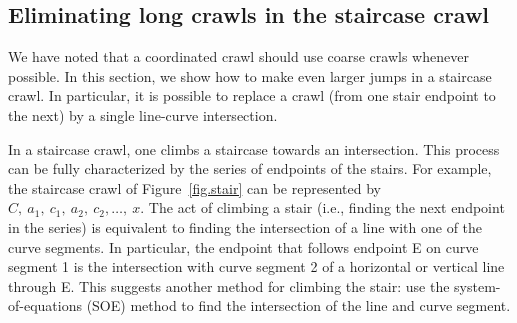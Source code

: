 \subsection{Eliminating long crawls in the staircase crawl}
\label{sub-linecurve}


We have noted that a coordinated crawl should use coarse crawls whenever possible.
In this section, we show how to make even larger jumps in a staircase crawl.
In particular, it is possible to replace a crawl (from one stair endpoint to the next)
by a single line-curve intersection.

In a staircase crawl, one climbs a staircase towards an intersection.
This process can be fully characterized by the series of endpoints of the stairs.
For example, the staircase crawl of Figure~\ref{fig.stair} can be represented by 
$C,\ a_{1},\ c_{1},\ a_{2},\ c_{2}, \ldots,\ x$.
The act of climbing a stair (i.e., finding the next endpoint in the series)
is equivalent to finding the intersection of a line with one of the curve segments.
In particular, the endpoint that follows endpoint E on curve segment 1 is the intersection 
with curve segment 2 of a horizontal or vertical line through E.
This suggests another method for climbing the stair: use the system-of-equations (SOE)
method to find the intersection of the line and curve segment.

